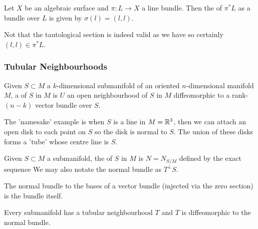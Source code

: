 \documentclass{article}
\begin{document}
\begin{definition}
	Let $X$ be an algebraic surface and $\pi:L \to X$ a line bundle. Then the  of $\pi^\ast L$ as a bundle over $L$ is given by $\sigma(l) = (l,l)$. 
\end{definition}

\begin{remark}
	Not that the tautological section is indeed valid as we have 
	so certainly $(l,l) \in \pi^\ast L$. 
\end{remark}

\subsubsection{Tubular Neighbourhoods}

\begin{definition}
	Given $S \subset M$ a $k$-dimensional submanifold of an oriented $n$-dimensional manifold $M$, a  of $S$ in $M$ is $U$ an open neighbourhood of $S$ in $M$ diffeomorphic to a rank-$(n-k)$ vector bundle over $S$. 
\end{definition}

\begin{example}
	The 'namesake' example is when $S$ is a line in $M=\mathbb{R}^3$, then we can attach an open disk to each point on $S$ so the disk is normal to $S$. The union of these disks forms a 'tube' whose centre line is $S$. 
\end{example}

\begin{definition}
	Given $S \subset M$ a submanifold, the  of $S$ in $M$ is $N = N_{S/M}$ defined by the exact sequence 
	We may also notate the normal bundle as $T^\perp S$.
\end{definition}

\begin{example}
	The normal bundle to the bases of a vector bundle (injected via the zero section) is the bundle itself.
\end{example}

\begin{theorem}
	Every submanifold has a tubular neighbourhood $T$ and $T$ is diffeomorphic to the normal bundle. 
\end{theorem}
\end{document}
